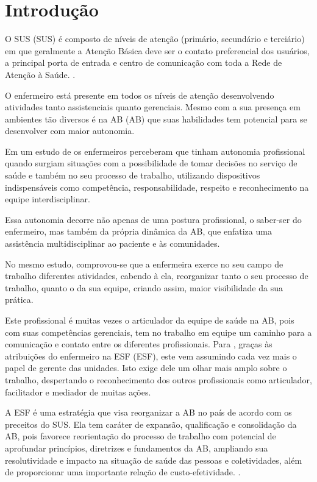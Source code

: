 \chapter{Introdução}
\label{cap:introducao}

O \acrlong{SUS} (\acrshort{SUS}) é composto de níveis de atenção (primário, secundário e terciário) em que geralmente a Atenção Básica deve ser o contato preferencial dos usuários, a principal porta de entrada e centro de comunicação com toda a Rede de Atenção à Saúde. \cite{ministerio2012politica}.

O enfermeiro está presente em todos os  níveis de atenção desenvolvendo atividades tanto assistenciais quanto gerenciais. Mesmo com a sua presença em ambientes tão diversos é na \acrlong{AB} (\acrshort{AB}) que suas habilidades tem potencial para se desenvolver com maior autonomia. 

Em um estudo de \cite{kalinowski2013autonomia} os enfermeiros perceberam que tinham autonomia profissional quando surgiam situações com a possibilidade de tomar decisões no serviço de saúde e também no seu processo de trabalho, utilizando dispositivos indispensáveis como competência, responsabilidade, respeito e reconhecimento na equipe interdisciplinar.

Essa autonomia decorre não apenas de uma postura profissional, o saber-ser do enfermeiro, mas também da própria dinâmica da \acrshort{AB}, que enfatiza uma assistência multidisciplinar ao paciente e às comunidades. 

No mesmo estudo, comprovou-se que a enfermeira exerce no seu campo de trabalho diferentes atividades, cabendo à ela, reorganizar tanto o seu processo de trabalho, quanto  o da sua equipe, criando assim, maior visibilidade da sua prática. 

Este profissional é muitas vezes o articulador da equipe de saúde na AB, pois com suas competências gerenciais, tem no trabalho em equipe um caminho para a comunicação e contato entre os diferentes profissionais. Para \cite{rocha2013avaliaccao}, graças às atribuições do enfermeiro na \acrlong{ESF} (\acrshort{ESF}), este vem assumindo cada vez mais o papel de gerente das unidades. Isto exige dele um olhar mais amplo sobre o trabalho, despertando o reconhecimento dos outros profissionais como articulador, facilitador e mediador de muitas ações. 

A \acrshort{ESF} é uma estratégia que visa reorganizar a \acrshort{AB} no país de acordo com os preceitos do \acrshort{SUS}. Ela tem caráter de expansão, qualificação e consolidação da \acrshort{AB}, pois favorece reorientação do processo de trabalho com potencial de aprofundar princípios, diretrizes e fundamentos da \acrshort{AB}, ampliando sua resolutividade e impacto na situação de saúde das pessoas e coletividades, além de proporcionar uma importante relação de custo-efetividade. \cite{ministerio2012politica}.

